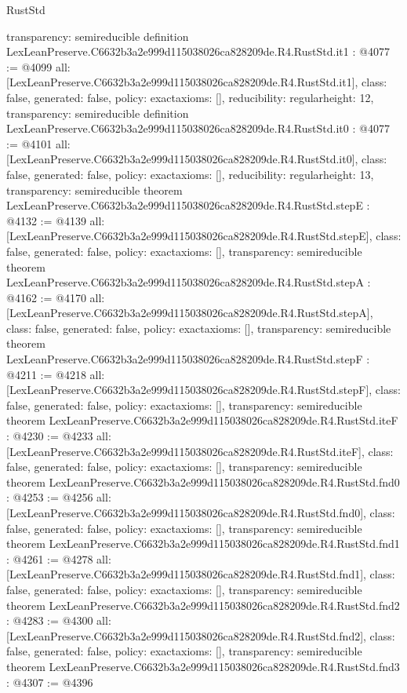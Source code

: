 \begin{lexlean}{RustStd}
\begin{coremodule}
{  transparency: semireducible
}
definition LexLeanPreserve.C6632b3a2e999d115038026ca828209de.R4.RustStd.it1 : @4077 := @4099 {
  all: [LexLeanPreserve.C6632b3a2e999d115038026ca828209de.R4.RustStd.it1],
  class: false,
  generated: false,
  policy: exact{axioms: []},
  reducibility: regular{height: 12},
  transparency: semireducible
}
definition LexLeanPreserve.C6632b3a2e999d115038026ca828209de.R4.RustStd.it0 : @4077 := @4101 {
  all: [LexLeanPreserve.C6632b3a2e999d115038026ca828209de.R4.RustStd.it0],
  class: false,
  generated: false,
  policy: exact{axioms: []},
  reducibility: regular{height: 13},
  transparency: semireducible
}
theorem LexLeanPreserve.C6632b3a2e999d115038026ca828209de.R4.RustStd.stepE : @4132 := @4139 {
  all: [LexLeanPreserve.C6632b3a2e999d115038026ca828209de.R4.RustStd.stepE],
  class: false,
  generated: false,
  policy: exact{axioms: []},
  transparency: semireducible
}
theorem LexLeanPreserve.C6632b3a2e999d115038026ca828209de.R4.RustStd.stepA : @4162 := @4170 {
  all: [LexLeanPreserve.C6632b3a2e999d115038026ca828209de.R4.RustStd.stepA],
  class: false,
  generated: false,
  policy: exact{axioms: []},
  transparency: semireducible
}
theorem LexLeanPreserve.C6632b3a2e999d115038026ca828209de.R4.RustStd.stepF : @4211 := @4218 {
  all: [LexLeanPreserve.C6632b3a2e999d115038026ca828209de.R4.RustStd.stepF],
  class: false,
  generated: false,
  policy: exact{axioms: []},
  transparency: semireducible
}
theorem LexLeanPreserve.C6632b3a2e999d115038026ca828209de.R4.RustStd.iteF : @4230 := @4233 {
  all: [LexLeanPreserve.C6632b3a2e999d115038026ca828209de.R4.RustStd.iteF],
  class: false,
  generated: false,
  policy: exact{axioms: []},
  transparency: semireducible
}
theorem LexLeanPreserve.C6632b3a2e999d115038026ca828209de.R4.RustStd.fnd0 : @4253 := @4256 {
  all: [LexLeanPreserve.C6632b3a2e999d115038026ca828209de.R4.RustStd.fnd0],
  class: false,
  generated: false,
  policy: exact{axioms: []},
  transparency: semireducible
}
theorem LexLeanPreserve.C6632b3a2e999d115038026ca828209de.R4.RustStd.fnd1 : @4261 := @4278 {
  all: [LexLeanPreserve.C6632b3a2e999d115038026ca828209de.R4.RustStd.fnd1],
  class: false,
  generated: false,
  policy: exact{axioms: []},
  transparency: semireducible
}
theorem LexLeanPreserve.C6632b3a2e999d115038026ca828209de.R4.RustStd.fnd2 : @4283 := @4300 {
  all: [LexLeanPreserve.C6632b3a2e999d115038026ca828209de.R4.RustStd.fnd2],
  class: false,
  generated: false,
  policy: exact{axioms: []},
  transparency: semireducible
}
theorem LexLeanPreserve.C6632b3a2e999d115038026ca828209de.R4.RustStd.fnd3 : @4307 := @4396 {
}
\end{coremodule}
\end{lexlean}
